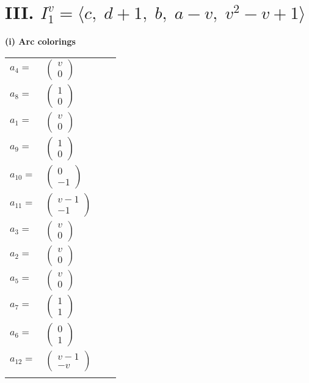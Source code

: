 \documentclass[1p]{elsarticle_modified}
\theoremstyle{definition}
\begin{document}
\centering \section*{III. $I^v_{1}= \langle c,\;d+1,\;b,\;a- v,\;v^2- v+1 \rangle$}
\flushleft \textbf{(i) Arc colorings}\\
\begin{tabular}{m{7pt} m{180pt} m{7pt} m{180pt} }
\flushright $a_{4}=$&$\begin{pmatrix}v\\0\end{pmatrix}$ \\
\flushright $a_{8}=$&$\begin{pmatrix}1\\0\end{pmatrix}$ \\
\flushright $a_{1}=$&$\begin{pmatrix}v\\0\end{pmatrix}$ \\
\flushright $a_{9}=$&$\begin{pmatrix}1\\0\end{pmatrix}$ \\
\flushright $a_{10}=$&$\begin{pmatrix}0\\-1\end{pmatrix}$ \\
\flushright $a_{11}=$&$\begin{pmatrix}v-1\\-1\end{pmatrix}$ \\
\flushright $a_{3}=$&$\begin{pmatrix}v\\0\end{pmatrix}$ \\
\flushright $a_{2}=$&$\begin{pmatrix}v\\0\end{pmatrix}$ \\
\flushright $a_{5}=$&$\begin{pmatrix}v\\0\end{pmatrix}$ \\
\flushright $a_{7}=$&$\begin{pmatrix}1\\1\end{pmatrix}$ \\
\flushright $a_{6}=$&$\begin{pmatrix}0\\1\end{pmatrix}$ \\
\flushright $a_{12}=$&$\begin{pmatrix}v-1\\- v\end{pmatrix}$\\&\end{tabular}
\end{document}
